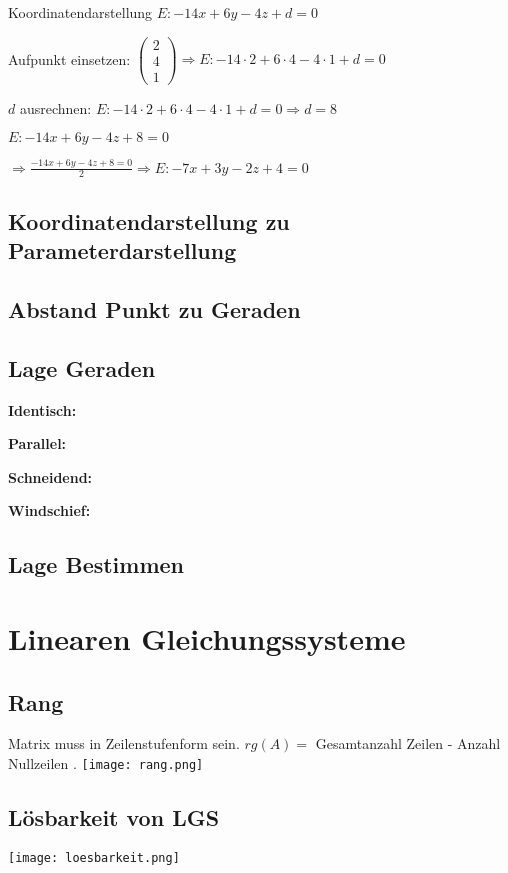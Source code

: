 \begin{multicols*}{3}
 Koordinatendarstellung $ E: -14x + 6y - 4z + d = 0$

 Aufpunkt einsetzen: $\begin{pmatrix}
2\\
4\\
1
\end{pmatrix} 	\Rightarrow  E: -14 \cdot 2  + 6 \cdot 4 - 4\cdot 1 + d = 0 $

 $d$ ausrechnen: $ E: -14 \cdot 2  + 6 \cdot 4 - 4\cdot 1 + d = 0 \Rightarrow d = 8$

 $E: -14x + 6y - 4z + 8 = 0$

$\Rightarrow \frac{-14x + 6y - 4z + 8 = 0}{2} \Rightarrow E: -7x + 3y - 2z + 4 = 0$ 

\subsection{Koordinatendarstellung zu Parameterdarstellung }


\subsection{Abstand Punkt zu Geraden}

\subsection{Lage Geraden}

\textbf{Identisch:}  

\textbf{Parallel:} 

\textbf{Schneidend:}

\textbf{Windschief:} 

\subsection{Lage Bestimmen}

\section{Linearen Gleichungssysteme}
\subsection{Rang}
{Matrix muss in Zeilenstufenform sein.}
{$rg(A) = $ Gesamtanzahl Zeilen - Anzahl Nullzeilen .}
 \texttt{[image: rang.png]} 
 
\subsection{Lösbarkeit von LGS}

 \texttt{[image: loesbarkeit.png]}


\WhiteSpace

\mbox{}
	
\end{multicols*} 


